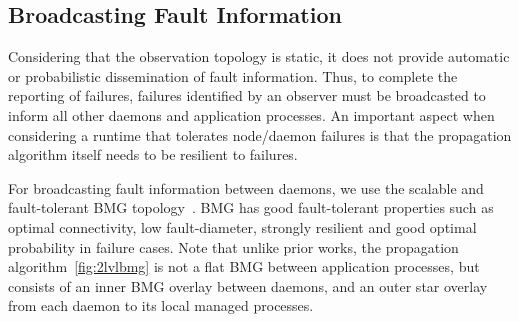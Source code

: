 \documentclass[5p,times,twocolumn]{elsarticle}
\begin{document}

\subsection{Broadcasting Fault Information}
Considering that the observation topology is static, it does not provide
automatic or probabilistic dissemination of fault information. Thus, to complete
the reporting of failures, failures identified by an observer must be broadcasted
to inform all other daemons and application processes. An important aspect
when considering a runtime that tolerates node/daemon failures is that the
propagation algorithm itself needs to be resilient to failures.

For broadcasting fault information between daemons, we use the scalable and fault-tolerant BMG topology~\cite{Angskun07}. BMG has good fault-tolerant properties such
as optimal connectivity, low fault-diameter, strongly resilient and good optimal
probability in failure cases. Note that unlike prior works, the propagation
algorithm~\ref{fig:2lvlbmg} is not a flat BMG between application processes, but consists of an
inner BMG overlay between daemons, and an outer star overlay from each daemon to its
local managed processes.
\end{document}
